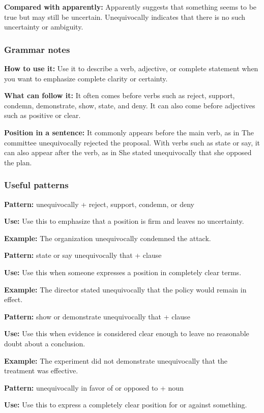 \documentclass[11pt]{article}
\begin{document}
\textbf{Compared with apparently:} Apparently suggests that something seems to be true but may still be uncertain. Unequivocally indicates that there is no such uncertainty or ambiguity.

\subsubsection{Grammar notes}
\textbf{How to use it:} Use it to describe a verb, adjective, or complete statement when you want to emphasize complete clarity or certainty.

\textbf{What can follow it:} It often comes before verbs such as reject, support, condemn, demonstrate, show, state, and deny. It can also come before adjectives such as positive or clear.

\textbf{Position in a sentence:} It commonly appears before the main verb, as in The committee unequivocally rejected the proposal. With verbs such as state or say, it can also appear after the verb, as in She stated unequivocally that she opposed the plan.

\subsubsection{Useful patterns}
\textbf{Pattern:} unequivocally + reject, support, condemn, or deny

\textbf{Use:} Use this to emphasize that a position is firm and leaves no uncertainty.

\textbf{Example:} The organization unequivocally condemned the attack.

\textbf{Pattern:} state or say unequivocally that + clause

\textbf{Use:} Use this when someone expresses a position in completely clear terms.

\textbf{Example:} The director stated unequivocally that the policy would remain in effect.

\textbf{Pattern:} show or demonstrate unequivocally that + clause

\textbf{Use:} Use this when evidence is considered clear enough to leave no reasonable doubt about a conclusion.

\textbf{Example:} The experiment did not demonstrate unequivocally that the treatment was effective.

\textbf{Pattern:} unequivocally in favor of or opposed to + noun

\textbf{Use:} Use this to express a completely clear position for or against something.
\end{document}
